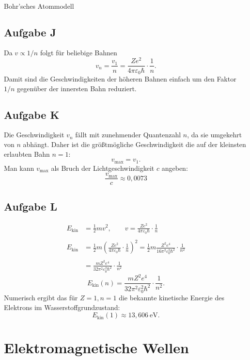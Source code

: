 \documentclass[11pt,a4paper,oneside]{article}
\begin{document}
	\begin{loesung}{Bohr'sches Atommodell}
		\subsection*{Aufgabe J}
		Da \(v\propto 1/n\) folgt für beliebige Bahnen
		\[
		\boxed{v_n = \frac{v_1}{n} = \frac{Z e^2}{4\pi\varepsilon_0\hbar}\cdot\frac{1}{n}.}
		\]
		Damit sind die Geschwindigkeiten der höheren Bahnen einfach um den Faktor \(1/n\) gegenüber der innersten Bahn reduziert.\\
		\subsection*{Aufgabe K}
		Die Geschwindigkeit \(v_n\) fällt mit zunehmender Quantenzahl \(n\), da sie umgekehrt von \(n\) abhängt. Daher ist die größtmögliche Geschwindigkeit die auf der kleinsten erlaubten Bahn \(n=1\):
		\[
		v_\text{max} = v_1.
		\]
		Man kann \(v_\text{max}\) als Bruch der Lichtgeschwindigkeit \(c\) angeben:
		\[
		\boxed{\frac{v_\text{max}}{c} \approx 0{,}0073}
		\]
		\subsection*{Aufgabe L}
		\begin{align*}
			E_\text{kin} &= \frac{1}{2} m v^2, \qquad
			v = \frac{Z e^2}{4 \pi \varepsilon_0 \hbar} \cdot \frac{1}{n} \\\\
			E_\text{kin} &= \frac{1}{2} m \left(\frac{Z e^2}{4 \pi \varepsilon_0 \hbar} \cdot \frac{1}{n}\right)^2 = \frac{1}{2} m \frac{Z^2 e^4}{16 \pi^2 \varepsilon_0^2 \hbar^2} \cdot \frac{1}{n^2} \\\\
			&= \frac{m Z^2 e^4}{32 \pi^2 \varepsilon_0^2 \hbar^2} \cdot \frac{1}{n^2}
		\end{align*}
		\[
		\boxed{E_\text{kin}(n) = \frac{m Z^2 e^4}{32 \pi^2 \varepsilon_0^2 \hbar^2} \cdot \frac{1}{n^2}}.
		\]
		Numerisch ergibt das für \(Z=1, n=1\) die bekannte kinetische Energie des Elektrons im Wasserstoffgrundzustand:
		\[
		E_\text{kin}(1) \approx 13{,}606\ \mathrm{eV}.
		\]
	\end{loesung}
	\newpage
	
	\section{Elektromagnetische Wellen}
\end{document}
